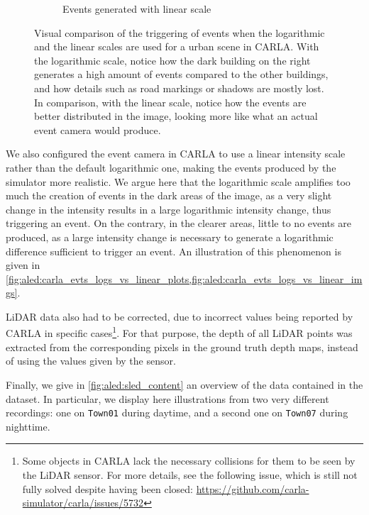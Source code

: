 \begin{figure}
\begin{subfigure}{0.475\linewidth}
    \caption{Events generated with linear scale}
  \end{subfigure}
  \caption{Visual comparison of the triggering of events when the logarithmic and the linear scales are used for a urban scene in CARLA. With the logarithmic scale, notice how the dark building on the right generates a high amount of events compared to the other buildings, and how details such as road markings or shadows are mostly lost. In comparison, with the linear scale, notice how the events are better distributed in the image, looking more like what an actual event camera would produce.}\label{fig:aled:carla_evts_logs_vs_linear_imgs}
\end{figure}

We also configured the event camera in CARLA to use a linear intensity scale rather than the default logarithmic one, making the events produced by the simulator more realistic. We argue here that the logarithmic scale amplifies too much the creation of events in the dark areas of the image, as a very slight change in the intensity results in a large logarithmic intensity change, thus triggering an event. On the contrary, in the clearer areas, little to no events are produced, as a large intensity change is necessary to generate a logarithmic difference sufficient to trigger an event. An illustration of this phenomenon is given in \cref{fig:aled:carla_evts_logs_vs_linear_plots,fig:aled:carla_evts_logs_vs_linear_imgs}.

LiDAR data also had to be corrected, due to incorrect values being reported by CARLA in specific cases\footnote{Some objects in CARLA lack the necessary collisions for them to be seen by the LiDAR sensor. For more details, see the following issue, which is still not fully solved despite having been closed: \url{https://github.com/carla-simulator/carla/issues/5732}}. For that purpose, the depth of all LiDAR points was extracted from the corresponding pixels in the ground truth depth maps, instead of using the values given by the sensor.

Finally, we give in \cref{fig:aled:sled_content} an overview of the data contained in the dataset. In particular, we display here illustrations from two very different recordings: one on \verb|Town01| during daytime, and a second one on \verb|Town07| during nighttime.

